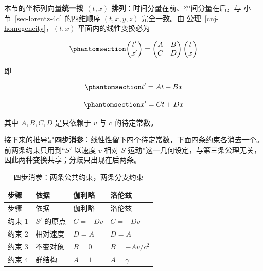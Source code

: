 \documentclass[
  chinese,
  a4paper,
  UTF8,
  12pt,
  oneside,
  openany]{ctexbook}
\theoremstyle{plain}
\theoremstyle{plain}
\theoremstyle{plain}
\theoremstyle{definition}
\theoremstyle{plain}
\theoremstyle{plain}
\theoremstyle{remark}
\begin{document}
本节的坐标列向量\textbf{统一按 \((t, x)\)
排列}：时间分量在前、空间分量在后，与 小节~\ref{sec-lorentz-4d}
的四维顺序 \((t, x, y, z)\) 完全一致。由
公理~\ref{cnj-homogeneity}，\((t, x)\) 平面内的线性变换必为

\begin{equation}\protect\phantomsection\label{eq-lambda}{
\begin{pmatrix} t' \\ x' \end{pmatrix}
=
\begin{pmatrix} A & B \\ C & D \end{pmatrix}
\begin{pmatrix} t \\ x \end{pmatrix}
}\end{equation}

即

\begin{equation}\protect\phantomsection\label{eq-lin-t}{
t' = A t + B x
}\end{equation}

\begin{equation}\protect\phantomsection\label{eq-lin-x}{
x' = C t + D x
}\end{equation}

其中 \(A, B, C, D\) 是只依赖于 \(v\) 与 \(c\) 的待定常数。

接下来的推导是\textbf{四步消参}：线性性留下四个待定常数，下面四条约束各消去一个。前两条约束只用到``\(S'\)
以速度 \(v\) 相对 \(S\)
运动''这一几何设定，与第三条公理无关，因此两种变换共享；分歧只出现在后两条。

\begin{longtable}[]{@{}llll@{}}
\caption{四步消参：两条公共约束，两条分支约束}\label{tbl-roadmap}\tabularnewline
\toprule\noalign{}
步骤 & 依据 & 伽利略 & 洛伦兹 \\
\midrule\noalign{}
\endfirsthead
\toprule\noalign{}
步骤 & 依据 & 伽利略 & 洛伦兹 \\
\midrule\noalign{}
\endhead
\bottomrule\noalign{}
\endlastfoot
约束 1 & \(S'\) 的原点 & \(C = -Dv\) & \(C = -Dv\) \\
约束 2 & 相对速度 & \(D = A\) & \(D = A\) \\
约束 3 & 不变对象 & \(B = 0\) & \(B = -Av/c^{2}\) \\
约束 4 & 群结构 & \(A = 1\) & \(A = \gamma\) \\
\end{longtable}
\end{document}
